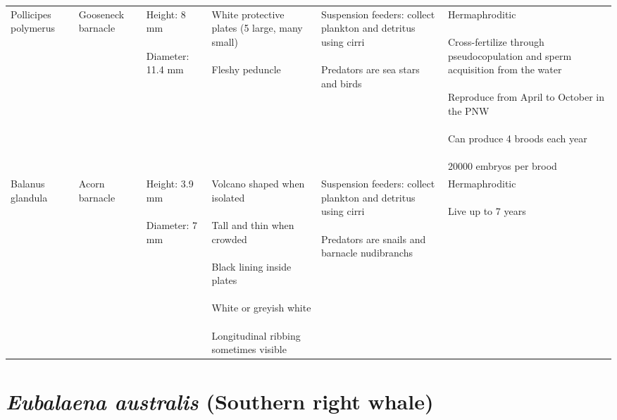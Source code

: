 \documentclass[
]{article}
\begin{document}
\begin{table}
{\begin{tabular}{>{\raggedright\arraybackslash}p{5em}>{\raggedright\arraybackslash}p{5em}llll}
Pollicipes polymerus & Gooseneck barnacle & \makecell[r]{Height: 8 mm\\\\Diameter: 11.4 mm} & \makecell[r]{White protective plates (5 large, many small)\\\\Fleshy peduncle} & \makecell[r]{Suspension feeders: collect plankton and detritus using cirri\\\\Predators are sea stars and birds} & \makecell[r]{Hermaphroditic\\\\Cross-fertilize through pseudocopulation and sperm acquisition from the water\\\\Reproduce from April to October in the PNW\\\\Can produce 4 broods each year\\\\20000 embryos per brood}\\
Balanus glandula & Acorn barnacle & \makecell[l]{Height: 3.9 mm\\\\Diameter: 7 mm} & \makecell[l]{Volcano shaped when isolated\\\\Tall and thin when crowded\\\\Black lining inside plates\\\\White or greyish white\\\\Longitudinal ribbing sometimes visible} & \makecell[l]{Suspension feeders: collect plankton and detritus using cirri\\\\Predators are snails and barnacle nudibranchs} & \makecell[l]{Hermaphroditic\\\\Live up to 7 years}\\
\bottomrule
\end{tabular}}
\end{table}

\newpage

\hypertarget{eubalaena-australis-southern-right-whale}{%
\section{\texorpdfstring{\emph{Eubalaena australis} (Southern right
whale)}{Eubalaena australis (Southern right whale)}}\label{eubalaena-australis-southern-right-whale}}
\end{document}
